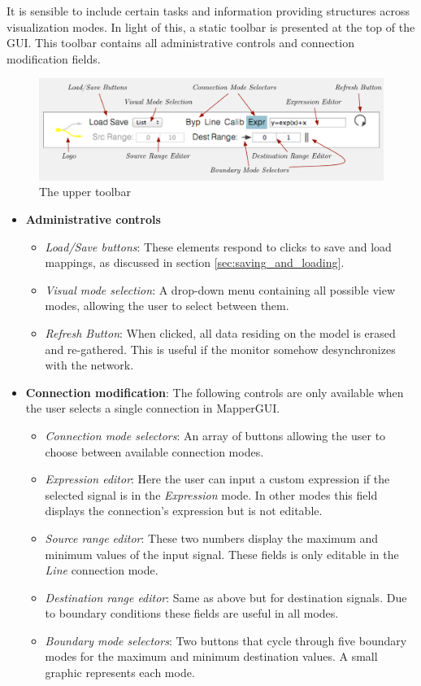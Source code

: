 It is sensible to include certain tasks and information providing structures across visualization modes. In light of this, a static toolbar is presented at the top of the GUI. This toolbar contains all administrative controls and connection modification fields.

\begin{figure}[!ht]
\centering
	\includegraphics[width=1\textwidth]{figures/top_toolbar}
\caption{The upper toolbar}
\label{fig:toolbar}
\end{figure}

\begin{itemize}
	\item \textbf{Administrative controls}
	\begin{itemize}
		\item\emph{Load/Save buttons}: These elements respond to clicks to save and load mappings, as discussed in section \ref{sec:saving_and_loading}.
		\item\emph{Visual mode selection}: A drop-down menu containing all possible view modes, allowing the user to select between them.
		\item\emph{Refresh Button}: When clicked, all data residing on the model is erased and re-gathered. This is useful if the monitor somehow desynchronizes with the network.
	\end{itemize}

	\item \textbf{Connection modification}: The following controls are only available when the user selects a single connection in MapperGUI.
	\begin{itemize}
		\item\emph{Connection mode selectors}: An array of buttons allowing the user to choose between available connection modes.
		\item\emph{Expression editor}: Here the user can input a custom expression if the selected signal is in the \emph{Expression} mode. In other modes this field displays the connection's expression but is not editable.
		\item\emph{Source range editor}: These two numbers display the maximum and minimum values of the input signal. These fields is only editable in the \emph{Line} connection mode.
		\item\emph{Destination range editor}: Same as above but for destination signals. Due to boundary conditions these fields are useful in all modes.
		\item\emph{Boundary mode selectors}: Two buttons that cycle through five boundary modes for the maximum and minimum destination values. A small graphic represents each mode.
	\end{itemize}
\end{itemize}

